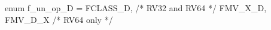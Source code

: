 enum f_un_op_D = {FCLASS_D,            /* RV32 and RV64 */
                  FMV_X_D, FMV_D_X}    /* RV64 only */
